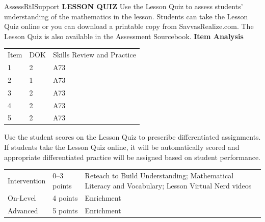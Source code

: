\documentclass{article}
\newenvironment{te-addendum}[2]{}{}     %
\begin{document}
\begin{te-addendum}{Assess}{RtISupport}
\textbf{LESSON QUIZ}
Use the Lesson Quiz to assess students' understanding of the mathematics in the lesson.
Students can take the Lesson Quiz online or you can download a printable copy from SavvasRealize.com. The Lesson Quiz is also available in the Assessment Sourcebook.
\textbf{Item Analysis}
\begin{tabular}{lll}
Item & DOK & Skills Review and Practice \\
1 & 2 & A73 \\
2 & 1 & A73 \\
3 & 2 & A73 \\
4 & 2 & A73 \\
5 & 2 & A73 \\
\end{tabular}
Use the student scores on the Lesson Quiz to prescribe differentiated assignments.
If students take the Lesson Quiz online, it will be automatically scored and appropriate differentiated practice will be assigned based on student performance.
\begin{tabular}{lll}
Intervention & 0--3 points & Reteach to Build Understanding; Mathematical Literacy and Vocabulary; Lesson Virtual Nerd videos \\
On-Level & 4 points & Enrichment \\
Advanced & 5 points & Enrichment \\
\end{tabular}
\end{te-addendum}
\end{document}
